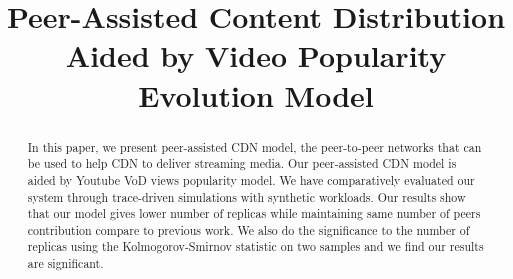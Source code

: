 \documentclass[10pt,final,journal,a4paper]{IEEEtran}
\begin{document}
%
\title{Peer-Assisted Content Distribution Aided by Video Popularity Evolution Model}

\author{
 \quad
{}
}








\maketitle


\begin{abstract}
In this paper, we present peer-assisted CDN model, the peer-to-peer networks that can be used to help CDN to deliver streaming media.
Our peer-assisted CDN model is aided by Youtube VoD views popularity model.
We have comparatively evaluated our system through trace-driven simulations with synthetic workloads.
Our results show that our model gives lower number of replicas while maintaining same number of peers contribution compare to previous work. 
We also do the significance to the number of replicas using the Kolmogorov-Smirnov statistic on two samples and we find our results are significant. 

\end{abstract}
\end{document}
